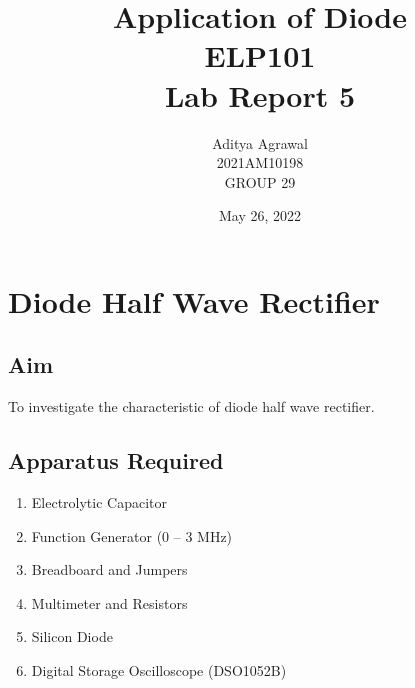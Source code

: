 \documentclass{article}
\title{Application of Diode\\ ELP101\\Lab Report 5}
\author{Aditya Agrawal\\2021AM10198\\GROUP 29}
\date{May 26, 2022}
\begin{document}
\maketitle
\tableofcontents
\newpage

\section{Diode Half Wave Rectifier}
\subsection{Aim}
To investigate the characteristic of diode half wave rectifier.
\subsection{Apparatus Required}
\begin{enumerate}
    \item Electrolytic Capacitor
    \item Function Generator (0 – 3 MHz)
    \item Breadboard and Jumpers
    \item Multimeter and Resistors
    \item Silicon Diode
    \item Digital Storage Oscilloscope (DSO1052B)
\end{enumerate}
\end{document}
